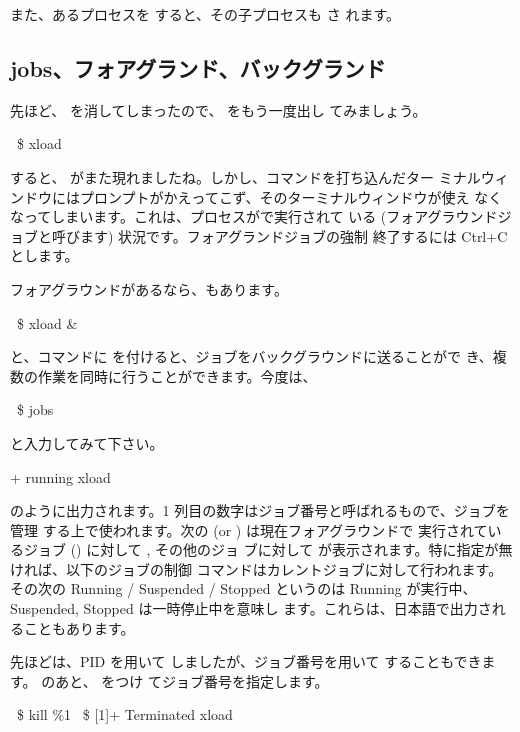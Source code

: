 \documentclass[platex]{jsarticle}
\begin{document}
  また、あるプロセスを  すると、その子プロセスも  さ
  れます。


  \subsection{jobs、フォアグランド、バックグランド}
  先ほど、 を消してしまったので、 をもう一度出し
  てみましょう。
  \begin{terminal}~\$ xload\end{terminal}
  すると、 がまた現れましたね。しかし、コマンドを打ち込んだター
  ミナルウィンドウにはプロンプトがかえってこず、そのターミナルウィンドウが使え
  なくなってしまいます。これは、プロセスがで実行されて
  いる (フォアグラウンドジョブと呼びます) 状況です。フォアグランドジョブの強制
  終了するには Ctrl+C とします。

  フォアグラウンドがあるなら、もあります。
  \begin{terminal}~\$ xload &\end{terminal}
  と、コマンドに \term{\&} を付けると、ジョブをバックグラウンドに送ることがで
  き、複数の作業を同時に行うことができます。今度は、
  \begin{terminal}~\$ jobs\end{terminal}
  と入力してみて下さい。
  \begin{terminal}[1]+  running                 xload\end{terminal}
  のように出力されます。1 列目の数字はジョブ番号と呼ばれるもので、ジョブを管理
  する上で使われます。次の \term{+} (or \term{-}) は現在フォアグラウンドで
  実行されているジョブ () に対して \term{+}, その他のジョ
  ブに対して \term{-} が表示されます。特に指定が無ければ、以下のジョブの制御
  コマンドはカレントジョブに対して行われます。その次の Running / Suspended /
  Stopped というのは Running が実行中、Suspended, Stopped は一時停止中を意味し
  ます。これらは、日本語で出力されることもあります。

  先ほどは、PID を用いて  しましたが、ジョブ番号を用いて
   することもできます。 のあと、\term{\%} をつけ
  てジョブ番号を指定します。
  \begin{terminal}%
~\$ kill \%1
~\$
[1]+  Terminated              xload\end{terminal}
\end{document}
